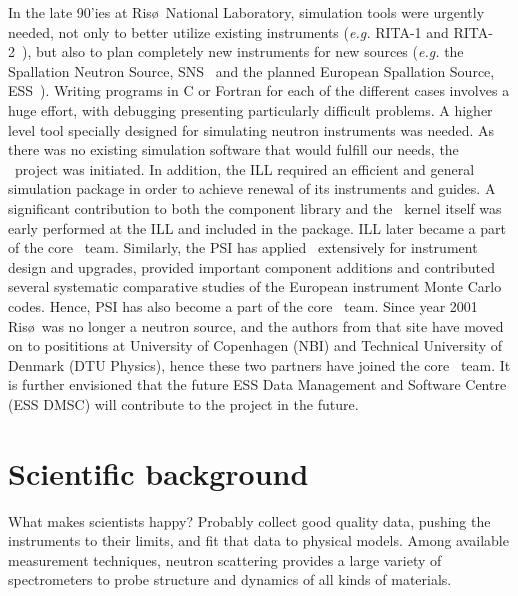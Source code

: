 In the late 90'ies at Ris\o\ National Laboratory,
simulation tools were urgently needed,
not only to better utilize existing instruments
({\em e.g.} RITA-1 and RITA-2~\cite{cjp_73_697,pb_241_50,pb_283_343}),
but also to plan completely new instruments for new sources
({\em e.g.} the Spallation Neutron Source, SNS~\cite{sns_webpage}
and the planned European Spallation Source, ESS~\cite{ess_webpage}).
Writing programs in C or Fortran for
each of the different cases involves a huge effort, with debugging presenting
particularly difficult problems. A higher level tool specially designed
for simulating neutron instruments was needed. As there was
no existing simulation software that would fulfill our needs, the \MCS\
project was initiated.
In addition, the ILL required an efficient and general simulation
package in order to achieve renewal of its instruments and guides.
A significant contribution to both the component library and the \MCS\
kernel itself was early performed at the ILL and included in the package.
ILL later became a part of the core \MCS\ team.
Similarly, the PSI has applied \MCS\ extensively for instrument design
and upgrades, provided important component additions and contributed
several systematic comparative studies of the European instrument
Monte Carlo codes. Hence, PSI has also become a part of the core \MCS\
team.
Since year 2001 Ris\o\ was no longer a neutron source, and the authors
from that site have moved on to posititions at University of Copenhagen
(NBI) and Technical University of Denmark (DTU Physics), hence these
two partners have joined the core \MCS\ team.
It is further envisioned that the future ESS Data Management and
Software Centre (ESS DMSC) will contribute to the project in the future.

\section{Scientific background}
What makes scientists happy? Probably collect good quality data, pushing the instruments to their limits, and fit that data to physical models.
Among available measurement techniques, neutron scattering provides a
large variety of spectrometers to probe structure and dynamics of all
kinds of materials.

